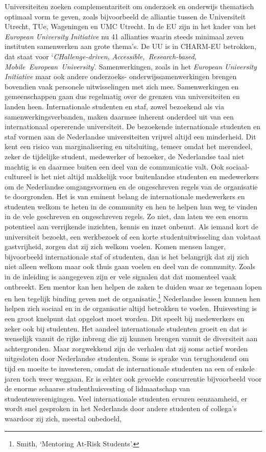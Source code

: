 \documentclass[smallauthor, chapterhaspagenum, nochapterinheader, pagenuminheader,  bigchapnum,medium2, tocpages,  garamond, titleinheader]{jote-book}
\begin{document}
	Universiteiten zoeken complementariteit om onderzoek en onderwijs thematisch optimaal vorm te geven, zoals bijvoorbeeld de alliantie tussen de Universiteit Utrecht, TUe, Wageningen en UMC Utrecht. In de EU zijn in het kader van het \emph{European University }\emph{Initiative} nu 41 allianties waarin steeds minimaal zeven instituten samenwerken aan grote thema's. De UU is in CHARM-EU betrokken, dat staat voor ‘\emph{CHallenge-driven}\emph{, }\emph{Accessible}\emph{, Research-}\emph{based}\emph{, Mobile European University}'. Samenwerkingen, zoals in het \emph{European University }\emph{Initiative} maar ook andere onderzoeks- onderwijssamenwerkingen brengen bovendien vaak personele uitwisselingen met zich mee. Samenwerkingen en gemeenschappen gaan dus regelmatig over de grenzen van universiteiten en landen heen. Internationale studenten en staf, zowel bezoekend als via samenwerkingsverbanden, maken daarmee inherent onderdeel uit van een internationaal opererende universiteit. De bezoekende internationale studenten en staf vormen aan de Nederlandse universiteiten vrijwel altijd een minderheid. Dit kent een risico van marginalisering en uitsluiting, temeer omdat het merendeel, zeker de tijdelijke student, medewerker of bezoeker, de Nederlandse taal niet machtig is en daarmee buiten een deel van de communicatie valt. Ook sociaal-cultureel is het niet altijd makkelijk voor buitenlandse studenten en medewerkers om de Nederlandse omgangsvormen en de ongeschreven regels van de organisatie te doorgronden. Het is van eminent belang de internationale medewerkers en studenten welkom te heten in de community en hen te helpen hun weg te vinden in de vele geschreven en ongeschreven regels. Zo niet, dan laten we een enorm potentieel aan verrijkende inzichten, kennis en inzet onbenut. Als iemand kort de universiteit bezoekt, een werkbezoek of een korte studentuitwisseling dan volstaat gastvrijheid, zorgen dat zij zich welkom voelen. Komen mensen langer, bijvoorbeeld internationale staf of studenten, dan is het belangrijk dat zij zich niet alleen welkom maar ook thuis gaan voelen en deel van de community. Zoals in de inleiding is aangegeven zijn er vele signalen dat dat momenteel vaak ontbreekt. Een mentor kan hen helpen de zaken te duiden waar ze tegenaan lopen en hen tegelijk binding geven met de organisatie.\footnote{Smith, ‘Mentoring At-Risk Students'.} Nederlandse lessen kunnen hen helpen zich sociaal en in de organisatie altijd betrokken te voelen. Huisvesting is een groot knelpunt dat opgelost moet worden. Dit speelt bij medewerkers en zeker ook bij studenten. Het aandeel internationale studenten groeit en dat is wenselijk vanuit de rijke inbreng die zij kunnen brengen vanuit de diversiteit aan achtergronden. Maar zorgwekkend zijn de verhalen dat zij soms actief worden uitgesloten door Nederlandse studenten. Soms is sprake van terughoudend om tijd en moeite te investeren, omdat de internationale studenten na een of enkele jaren toch weer weggaan. Er is echter ook gevoelde concurrentie bijvoorbeeld voor de enorme schaarse studenthuisvesting of lidmaatschap van studentenverenigingen. Veel internationale studenten ervaren eenzaamheid, er wordt snel gesproken in het Nederlands door andere studenten of collega's waardoor zij zich, meestal onbedoeld, 
\end{document}
